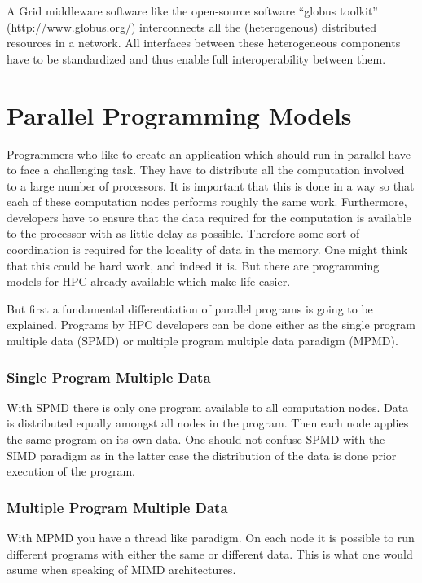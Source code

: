 A Grid middleware software like the open-source software ``globus
toolkit'' (\url{http://www.globus.org/}) interconnects all the (heterogenous)
distributed resources in a network.  
All interfaces between these heterogeneous components have to be standardized
and thus enable full interoperability between them.

\section{Parallel Programming Models}
\label{sec:programming_models}

Programmers who like to create an application which should run in
parallel have to face a challenging task. They have to distribute all
the computation involved to a large number of processors. It is
important that this is done in a way so that each of these computation
nodes performs roughly the same work. Furthermore, developers have to
ensure that the data required for the computation is available to the
processor with as little delay as possible. Therefore some sort of
coordination is required for the locality of data in the memory.
One might think that this could be hard work, and indeed it is. But
there are programming models for HPC already available which make life
easier.

But first a fundamental differentiation of parallel programs is going
to be explained. Programs by HPC developers can be done either
as the single program multiple data (SPMD) or multiple program
multiple data paradigm (MPMD).

\subsubsection{Single Program Multiple Data}

With SPMD there is only one program available
to all computation nodes. Data is distributed equally amongst all
nodes in the program. Then each node applies the same program on its
own data. One should not confuse SPMD with the SIMD paradigm as in the
latter case the
distribution of the data is done prior execution of the program.

\subsubsection{Multiple Program Multiple Data}

With MPMD you have a thread like paradigm. On each node it is possible
to run different programs with either the same or different data. This
is what one would asume when speaking of MIMD architectures.  

